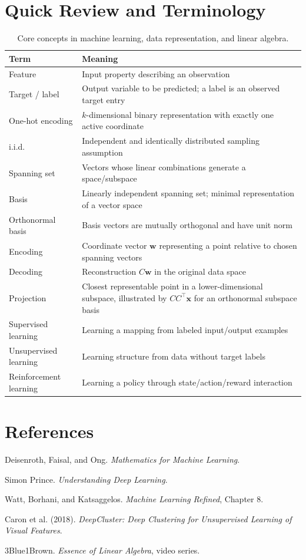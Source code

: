 \documentclass[11pt,a4paper]{article}
\newcommand{\vect}[1]{\bm{#1}}
\begin{document}
\section{Quick Review and Terminology}
\begin{table}[H]
\centering
\caption{Core concepts in machine learning, data representation, and linear algebra.}
\small
\begin{tabularx}{\textwidth}{@{}p{}Y@{}}
\toprule
\textbf{Term} & \textbf{Meaning}\\
\midrule
Feature & Input property describing an observation\\
Target / label & Output variable to be predicted; a label is an observed target entry\\
One-hot encoding & $k$-dimensional binary representation with exactly one active coordinate\\
i.i.d. & Independent and identically distributed sampling assumption\\
Spanning set & Vectors whose linear combinations generate a space/subspace\\
Basis & Linearly independent spanning set; minimal representation of a vector space\\
Orthonormal basis & Basis vectors are mutually orthogonal and have unit norm\\
Encoding & Coordinate vector $\vect w$ representing a point relative to chosen spanning vectors\\
Decoding & Reconstruction $C\vect w$ in the original data space\\
Projection & Closest representable point in a lower-dimensional subspace, illustrated by $CC^\top\vect x$ for an orthonormal subspace basis\\
Supervised learning & Learning a mapping from labeled input/output examples\\
Unsupervised learning & Learning structure from data without target labels\\
Reinforcement learning & Learning a policy through state/action/reward interaction\\
\bottomrule
\end{tabularx}
\end{table}


\section*{References}
{}
\begin{enumerate}[label={[\arabic*]},itemsep=0.45em]
  \item Deisenroth, Faisal, and Ong. \emph{Mathematics for Machine Learning}.
  \item Simon Prince. \emph{Understanding Deep Learning}.
  \item Watt, Borhani, and Katsaggelos. \emph{Machine Learning Refined}, Chapter 8.
  \item Caron et al. (2018). \emph{DeepCluster: Deep Clustering for Unsupervised Learning of Visual Features}.
  \item 3Blue1Brown. \emph{Essence of Linear Algebra}, video series.
\end{enumerate}
\end{document}
